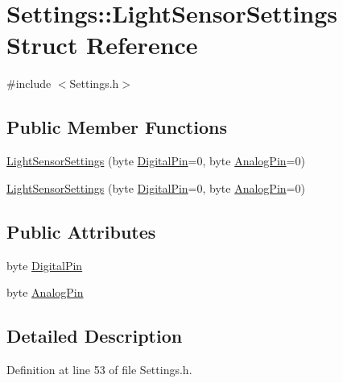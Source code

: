 \hypertarget{struct_settings_1_1_light_sensor_settings}{}\section{Settings\+:\+:Light\+Sensor\+Settings Struct Reference}
\label{struct_settings_1_1_light_sensor_settings}


{\ttfamily \#include $<$Settings.\+h$>$}

\subsection*{Public Member Functions}
\begin{DoxyCompactItemize}
\item 
\hyperlink{struct_settings_1_1_light_sensor_settings_ac70671853c71fb80e58d07f6505e5c42}{Light\+Sensor\+Settings} (byte \hyperlink{struct_settings_1_1_light_sensor_settings_af1d29f3ccbb8ae9f003e426941a281e1}{Digital\+Pin}=0, byte \hyperlink{struct_settings_1_1_light_sensor_settings_afbab965ecafd9dd0f34e361a6487c43d}{Analog\+Pin}=0)
\item 
\hyperlink{struct_settings_1_1_light_sensor_settings_ac70671853c71fb80e58d07f6505e5c42}{Light\+Sensor\+Settings} (byte \hyperlink{struct_settings_1_1_light_sensor_settings_af1d29f3ccbb8ae9f003e426941a281e1}{Digital\+Pin}=0, byte \hyperlink{struct_settings_1_1_light_sensor_settings_afbab965ecafd9dd0f34e361a6487c43d}{Analog\+Pin}=0)
\end{DoxyCompactItemize}
\subsection*{Public Attributes}
\begin{DoxyCompactItemize}
\item 
byte \hyperlink{struct_settings_1_1_light_sensor_settings_af1d29f3ccbb8ae9f003e426941a281e1}{Digital\+Pin}
\item 
byte \hyperlink{struct_settings_1_1_light_sensor_settings_afbab965ecafd9dd0f34e361a6487c43d}{Analog\+Pin}
\end{DoxyCompactItemize}


\subsection{Detailed Description}


Definition at line 53 of file Settings.\+h.



